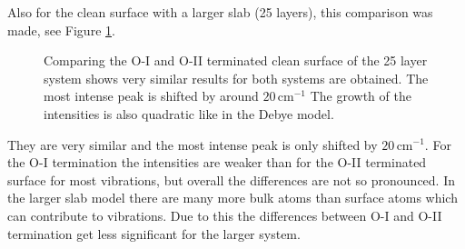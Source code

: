 \documentclass[11pt,DIV=13,BCOR=5mm,a4paper,headinclude]{scrbook}
\begin{document}
Also for the clean surface with a larger slab (25 layers), this comparison was made, see Figure \ref{abb:comp_O-I-O-II_25}.
\begin{figure}[!h]
 \centering
 \caption{Comparing the O-I and O-II terminated clean surface of the 25 layer system shows very similar results for both systems are obtained.
The most intense peak is shifted by around $20\,$cm$^{-1}$
The growth of the intensities is also quadratic like in the Debye model.}
 \label{abb:comp_O-I-O-II_25}
\end{figure}
They are very similar and the most intense peak is only shifted by $20\,$cm$^{-1}$.
For the O-I termination the intensities are weaker than for the O-II terminated surface for most vibrations, but overall the differences are not so pronounced.
In the larger slab model there are many more bulk atoms than surface atoms which can contribute to vibrations.
Due to this the differences between O-I and O-II termination get less significant for the larger system.


\renewcommand{\cleardoublepage}{}
~
\clearpage
~
\clearpage
{}
\end{document}
